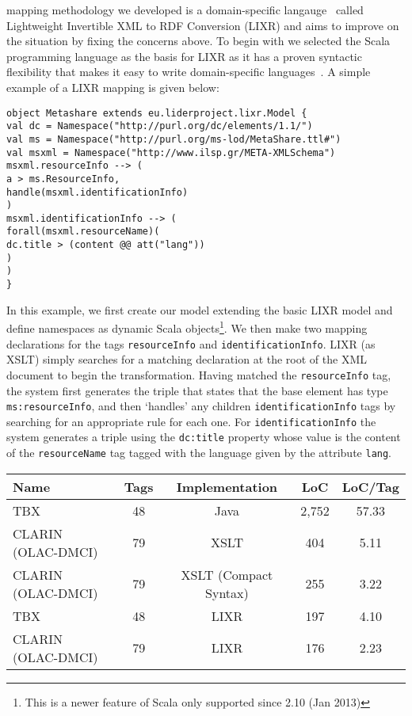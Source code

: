 \documentclass{llncs}
\begin{document}
{mapping methodology we developed is a domain-specific
langauge~\cite{fowler2010domain} called Lightweight Invertible XML to RDF
Conversion (LIXR) and aims to improve on the situation by fixing the concerns
above.
To begin with we selected the Scala programming language as the basis for LIXR
as it has a proven syntactic flexibility that makes it easy to write
domain-specific languages~\cite{wampler2008programming}. A simple example of a
LIXR mapping is given below:
{\footnotesize
\begin{verbatim}
object Metashare extends eu.liderproject.lixr.Model {
val dc = Namespace("http://purl.org/dc/elements/1.1/")
val ms = Namespace("http://purl.org/ms-lod/MetaShare.ttl#")
val msxml = Namespace("http://www.ilsp.gr/META-XMLSchema")
msxml.resourceInfo --> (
a > ms.ResourceInfo,
handle(msxml.identificationInfo)
)
msxml.identificationInfo --> (
forall(msxml.resourceName)(
dc.title > (content @@ att("lang"))
)
)
}
\end{verbatim}}
In this example, we first create our model extending the basic LIXR model and
define namespaces as dynamic Scala objects\footnote{This is a newer feature of
Scala only supported since 2.10 (Jan 2013)}. We then make two mapping
declarations for the tags {\tt resourceInfo} and {\tt identificationInfo}. LIXR (as
XSLT) simply searches for a matching declaration at the root of the XML document
to begin the transformation. Having matched the {\tt resourceInfo} tag, the system
first generates the triple that states that the base element has type
{\tt ms:resourceInfo}, and then `handles' any children {\tt identificationInfo} tags by
searching for an appropriate rule for each one. For {\tt identificationInfo} the
system generates a triple using the {\tt dc:title} property whose value is the
content of the {\tt resourceName} tag tagged with the language given by the
attribute {\tt lang}.
\begin{table}
\begin{center}
\begin{tabular}{p{4cm}|cccc}
Name & Tags & Implementation & LoC & LoC/Tag \\
\hline
TBX & 48 & Java & 2,752 & 57.33 \\
CLARIN (OLAC-DMCI) & 79 & XSLT & 404 & 5.11 \\
CLARIN (OLAC-DMCI) & 79 & XSLT (Compact Syntax) & 255 & 3.22 \\
\hline
TBX & 48 & LIXR & 197 & 4.10 \\
CLARIN (OLAC-DMCI) & 79 & LIXR & 176 & 2.23 \\

\end{tabular}
\end{center}
\end{table}}
\end{document}
